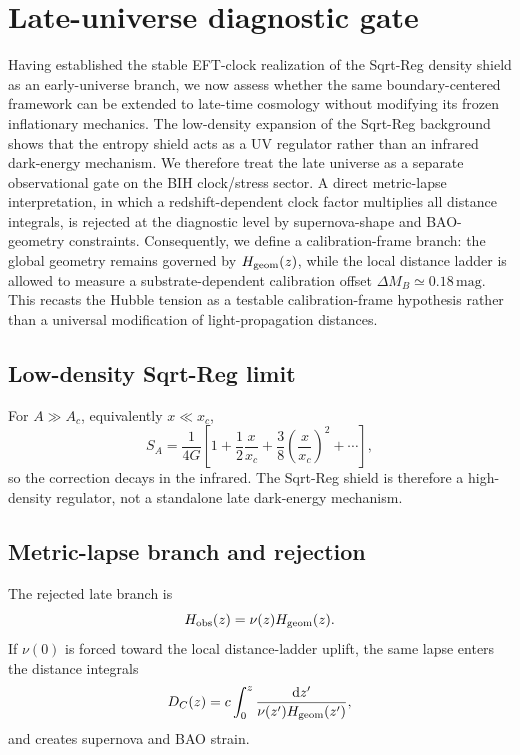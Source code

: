 \documentclass[11pt]{article}
\newcommand{\dd}{\mathrm{d}}
\begin{document}
\section{Late-universe diagnostic gate}\label{sec:late_gate}
Having established the stable EFT-clock realization of the Sqrt-Reg density shield as an early-universe branch, we now assess whether the same boundary-centered framework can be extended to late-time cosmology without modifying its frozen inflationary mechanics. The low-density expansion of the Sqrt-Reg background shows that the entropy shield acts as a UV regulator rather than an infrared dark-energy mechanism. We therefore treat the late universe as a separate observational gate on the BIH clock/stress sector. A direct metric-lapse interpretation, in which a redshift-dependent clock factor multiplies all distance integrals, is rejected at the diagnostic level by supernova-shape and BAO-geometry constraints. Consequently, we define a calibration-frame branch: the global geometry remains governed by $H_{\rm geom}(z)$, while the local distance ladder is allowed to measure a substrate-dependent calibration offset $\Delta M_B\simeq0.18\,\mathrm{mag}$. This recasts the Hubble tension as a testable calibration-frame hypothesis rather than a universal modification of light-propagation distances.

\subsection{Low-density Sqrt-Reg limit}
For $A\gg A_c$, equivalently $x\ll x_c$,
\begin{equation}
S_A=\frac{1}{4G}\left[1+\frac{1}{2}\frac{x}{x_c}+\frac{3}{8}\left(\frac{x}{x_c}\right)^2+\cdots\right],
\end{equation}
so the correction decays in the infrared. The Sqrt-Reg shield is therefore a high-density regulator, not a standalone late dark-energy mechanism.

\subsection{Metric-lapse branch and rejection}
The rejected late branch is
\begin{equation}
H_{\rm obs}(z)=\nu(z)H_{\rm geom}(z).
\end{equation}
If $\nu(0)$ is forced toward the local distance-ladder uplift, the same lapse enters the distance integrals
\begin{equation}
D_C(z)=c\int_0^z\frac{\dd z'}{\nu(z')H_{\rm geom}(z')},
\end{equation}
and creates supernova and BAO strain.
\end{document}

